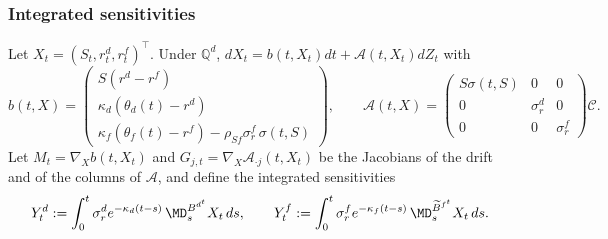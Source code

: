 \subsubsection{Integrated sensitivities}
Let $X_t=(S_t,r^d_t,r^f_t)^\top$. Under $\mathbb{Q}^d$, $dX_t=b(t,X_t)dt+\mathcal{A}(t,X_t)dZ_t$ with
$$ b(t,X)=\begin{pmatrix} S(r^d-r^f)\\ \kappa_d(\theta_d(t)-r^d)\\ \kappa_f(\theta_f(t)-r^f)-\rho_{Sf}\sigma^f_r\,\sigma(t,S)\end{pmatrix},\qquad
\mathcal{A}(t,X)=\begin{pmatrix} S\sigma(t,S)&0&0\\ 0&\sigma^d_r&0\\ 0&0&\sigma^f_r\end{pmatrix}\mathcal{C}. $$
Let $M_t=\nabla_Xb(t,X_t)$ and $G_{j,t}=\nabla_X\mathcal{A}_{\cdot j}(t,X_t)$ be the Jacobians of the drift and of the columns of $\mathcal{A}$, and define the integrated sensitivities
\begin{equation}\label{eq: integratedSensitivities}
Y^d_t:=\int_0^t\sigma^d_re^{-\kappa_d(t-s)}\,\MD^{B^{d^t}}_sX_t\,ds,\qquad
Y^f_t:=\int_0^t\sigma^f_re^{-\kappa_f(t-s)}\,\MD^{\widetilde{B}^{f^t}}_sX_t\,ds .
\end{equation}
